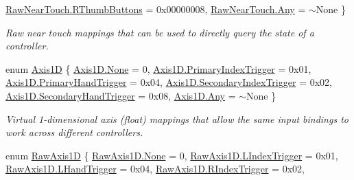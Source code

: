 \begin{DoxyCompactItemize}
\mbox{\hyperlink{class_o_v_r_input_ac9c3c10aa9911507c6dc66e2dd6ec60ea62dfe22c21f7c46d025b41f5b0d78a33}{Raw\+Near\+Touch.\+R\+Thumb\+Buttons}} = 0x00000008, 
\mbox{\hyperlink{class_o_v_r_input_ac9c3c10aa9911507c6dc66e2dd6ec60eaed36a1ef76a59ee3f15180e0441188ad}{Raw\+Near\+Touch.\+Any}} = $\sim$\+None
 \}
\begin{DoxyCompactList}\small\item\em Raw near touch mappings that can be used to directly query the state of a controller. \end{DoxyCompactList}\item 
enum \mbox{\hyperlink{class_o_v_r_input_af5c3e63489ca9ee2e5db3a657f7f27f6}{Axis1D}} \{ \newline
\mbox{\hyperlink{class_o_v_r_input_af5c3e63489ca9ee2e5db3a657f7f27f6a6adf97f83acf6453d4a6a4b1070f3754}{Axis1\+D.\+None}} = 0, 
\mbox{\hyperlink{class_o_v_r_input_af5c3e63489ca9ee2e5db3a657f7f27f6a05ce3346fd067f05de712c153423a543}{Axis1\+D.\+Primary\+Index\+Trigger}} = 0x01, 
\mbox{\hyperlink{class_o_v_r_input_af5c3e63489ca9ee2e5db3a657f7f27f6a2a8de88690d6135dc9389b0ce8014bd6}{Axis1\+D.\+Primary\+Hand\+Trigger}} = 0x04, 
\mbox{\hyperlink{class_o_v_r_input_af5c3e63489ca9ee2e5db3a657f7f27f6a8e997b6d1a9db4d4084bdb67c3701b01}{Axis1\+D.\+Secondary\+Index\+Trigger}} = 0x02, 
\newline
\mbox{\hyperlink{class_o_v_r_input_af5c3e63489ca9ee2e5db3a657f7f27f6aad324586099c56274933df3594e0da91}{Axis1\+D.\+Secondary\+Hand\+Trigger}} = 0x08, 
\mbox{\hyperlink{class_o_v_r_input_af5c3e63489ca9ee2e5db3a657f7f27f6aed36a1ef76a59ee3f15180e0441188ad}{Axis1\+D.\+Any}} = $\sim$\+None
 \}
\begin{DoxyCompactList}\small\item\em Virtual 1-\/dimensional axis (float) mappings that allow the same input bindings to work across different controllers. \end{DoxyCompactList}\item 
enum \mbox{\hyperlink{class_o_v_r_input_a9c9eff2910ca07d1fb0e924273ebefaf}{Raw\+Axis1D}} \{ \newline
\mbox{\hyperlink{class_o_v_r_input_a9c9eff2910ca07d1fb0e924273ebefafa6adf97f83acf6453d4a6a4b1070f3754}{Raw\+Axis1\+D.\+None}} = 0, 
\mbox{\hyperlink{class_o_v_r_input_a9c9eff2910ca07d1fb0e924273ebefafa539fc444c6c42c09fec1c86daa96b8a2}{Raw\+Axis1\+D.\+L\+Index\+Trigger}} = 0x01, 
\mbox{\hyperlink{class_o_v_r_input_a9c9eff2910ca07d1fb0e924273ebefafa0676a01bc10e9f8770512c041832f748}{Raw\+Axis1\+D.\+L\+Hand\+Trigger}} = 0x04, 
\mbox{\hyperlink{class_o_v_r_input_a9c9eff2910ca07d1fb0e924273ebefafa0501589371e70c45f36658f9bb4b7843}{Raw\+Axis1\+D.\+R\+Index\+Trigger}} = 0x02, 

\end{DoxyCompactItemize}
